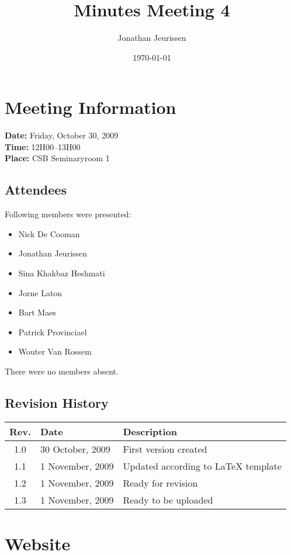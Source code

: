 \documentclass[a4paper, 12pt]{article}
\begin{document}
\title{Minutes Meeting 4}
\author{Jonathan Jeurissen}
\date{\today}

\maketitle	
	\section{Meeting Information}
			\textbf{Date:} Friday, October 30, 2009\\
			\textbf{Time:} 12H00--13H00\\
			\textbf{Place:} CSB Seminaryroom 1\\
		\subsection{Attendees}
Following members were presented:
			\begin{itemize}
				\item Nick De Cooman
				\item Jonathan Jeurissen
				\item Sina Khakbaz Heshmati
				\item Jorne Laton
				\item Bart Maes
				\item Patrick Provinciael
				\item Wouter Van Rossem
			\end{itemize}
There were no members absent.
		\subsection{Revision History}
			\begin{tabular}{c | l | l }
				\textbf{Rev.} & \textbf{Date} & \textbf{Description} \\
				\hline
				1.0 & 30 October, 2009 & First version created \\
				1.1 & 1 November, 2009 & Updated according to \LaTeX{} template \\
				1.2 & 1 November, 2009 & Ready for revision \\
				1.3 & 1 November, 2009 & Ready to be uploaded \\
			\end{tabular}		
	
	\section{Website}
	
\end{document}
